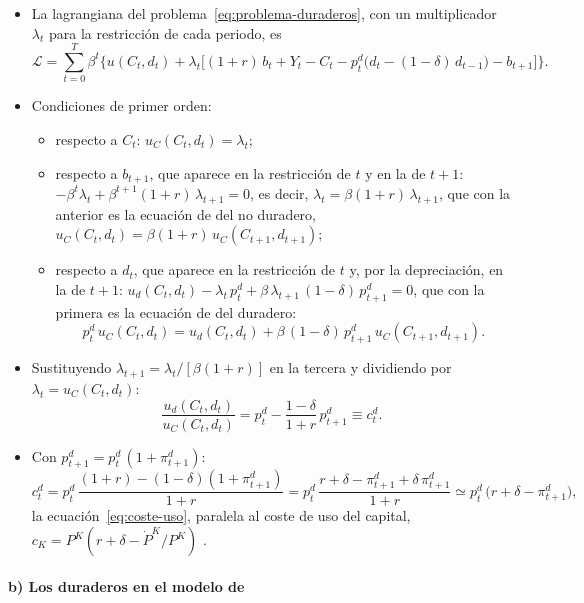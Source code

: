 \documentclass[11pt]{article}
\begin{document}
\begin{itemize}
\item La lagrangiana del problema~\eqref{eq:problema-duraderos}, con un multiplicador $\lambda_t$ para la restricción de cada periodo, es
  \begin{equation*}
  \mathcal{L}=\sum_{t=0}^{T}\beta^t\Big\{u(C_t,d_t)+\lambda_t\Big[(1+r)\,b_t+Y_t-C_t-p^d_t\big(d_t-(1-\delta)\,d_{t-1}\big)-b_{t+1}\Big]\Big\}.
  \end{equation*}
\item Condiciones de primer orden:
  \begin{itemize}
  \item respecto a $C_t$: $u_C(C_t,d_t)=\lambda_t$;
  \item respecto a $b_{t+1}$, que aparece en la restricción de $t$ y en la de $t+1$: $-\beta^t\lambda_t+\beta^{t+1}(1+r)\,\lambda_{t+1}=0$, es decir, $\lambda_t=\beta(1+r)\,\lambda_{t+1}$, que con la anterior es la ecuación de  del no duradero, $u_C(C_t,d_t)=\beta(1+r)\,u_C(C_{t+1},d_{t+1})$;
  \item respecto a $d_t$, que aparece en la restricción de $t$ y, por la depreciación, en la de $t+1$: $u_d(C_t,d_t)-\lambda_t\,p^d_t+\beta\,\lambda_{t+1}\,(1-\delta)\,p^d_{t+1}=0$, que con la primera es la ecuación de  del duradero:
    \begin{equation*}
    p^d_t\,u_C(C_t,d_t)=u_d(C_t,d_t)+\beta\,(1-\delta)\,p^d_{t+1}\,u_C(C_{t+1},d_{t+1}).
    \end{equation*}
  \end{itemize}
\item Sustituyendo $\lambda_{t+1}=\lambda_t/[\beta(1+r)]$ en la tercera y dividiendo por $\lambda_t=u_C(C_t,d_t)$:
  \begin{equation*}
  \frac{u_d(C_t,d_t)}{u_C(C_t,d_t)}=p^d_t-\frac{1-\delta}{1+r}\,p^d_{t+1}\equiv c^d_t.
  \end{equation*}
\item Con $p^d_{t+1}=p^d_t\,(1+\pi^d_{t+1})$:
  \begin{equation*}
  c^d_t=p^d_t\,\frac{(1+r)-(1-\delta)(1+\pi^d_{t+1})}{1+r}=p^d_t\,\frac{r+\delta-\pi^d_{t+1}+\delta\,\pi^d_{t+1}}{1+r}\simeq p^d_t\,\big(r+\delta-\pi^d_{t+1}\big),
  \end{equation*}
  la ecuación~\eqref{eq:coste-uso}, paralela al coste de uso del capital, $c_K=P^K(r+\delta-\dot{P}^K/P^K)$ .\findemo
\end{itemize}

\paragraph{b) Los duraderos en el modelo de \nocite{Mankiw1982Hall}}
\end{document}
